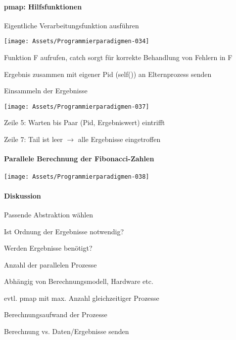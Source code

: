 \documentclass[10pt]{article}
\begin{document}
\paragraph{pmap: Hilfsfunktionen}
\color{orange} Eigentliche Verarbeitungsfunktion ausführen \color{black}
\begin{center}
  \texttt{[image: Assets/Programmierparadigmen-034]}
\end{center}

\begin{itemize*}
  \item Funktion F aufrufen, catch sorgt für korrekte Behandlung von Fehlern in F
  \item Ergebnis zusammen mit eigener Pid (self()) an Elternprozess senden
\end{itemize*}

\color{orange} Einsammeln der Ergebnisse \color{black}
\begin{center}
  \texttt{[image: Assets/Programmierparadigmen-037]}
\end{center}
\begin{itemize*}
  \item Zeile 5: Warten bis Paar (Pid, Ergebniswert) eintrifft
  \item Zeile 7: Tail ist leer $\rightarrow$ alle Ergebnisse eingetroffen
\end{itemize*}

\paragraph{Parallele Berechnung der Fibonacci-Zahlen}
\begin{center}
  \texttt{[image: Assets/Programmierparadigmen-038]}
\end{center}

\paragraph{Diskussion}
\begin{itemize*}
  \item Passende Abstraktion wählen
  \begin{itemize*}
    \item Ist Ordnung der Ergebnisse notwendig?
    \item Werden Ergebnisse benötigt?
  \end{itemize*}
  \item Anzahl der parallelen Prozesse
  \begin{itemize*}
    \item Abhängig von Berechnungsmodell, Hardware etc.
    \item evtl. pmap mit max. Anzahl gleichzeitiger Prozesse
  \end{itemize*}
  \item Berechnungsaufwand der Prozesse
  \begin{itemize*}
    \item Berechnung vs. Daten/Ergebnisse senden
  \end{itemize*}
\end{itemize*}
\end{document}
